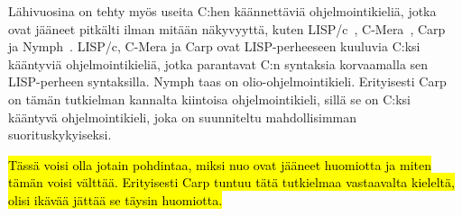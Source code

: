 Lähivuosina on tehty myös useita C:hen käännettäviä ohjelmointikieliä, jotka
ovat jääneet pitkälti ilman mitään näkyvyyttä, kuten LISP/c~\citep{clisp1},
C-Mera~\citep{clisp2}, Carp~\citep{clisp3} ja Nymph~\citep{nymph}. LISP/c,
C-Mera ja Carp ovat LISP-perheeseen kuuluvia C:ksi kääntyviä ohjelmointikieliä,
jotka parantavat C:n syntaksia korvaamalla sen LISP-perheen syntaksilla. Nymph
taas on olio-ohjelmointikieli. Erityisesti Carp on tämän tutkielman kannalta
kiintoisa ohjelmointikieli, sillä se on C:ksi kääntyvä ohjelmointikieli, joka
on suunniteltu mahdollisimman suorituskykyiseksi.

\hl{Tässä voisi olla jotain pohdintaa, miksi nuo ovat jääneet huomiotta ja
miten tämän voisi välttää. Erityisesti Carp tuntuu tätä tutkielmaa vastaavalta
kieleltä, olisi ikävää jättää se täysin huomiotta.}

